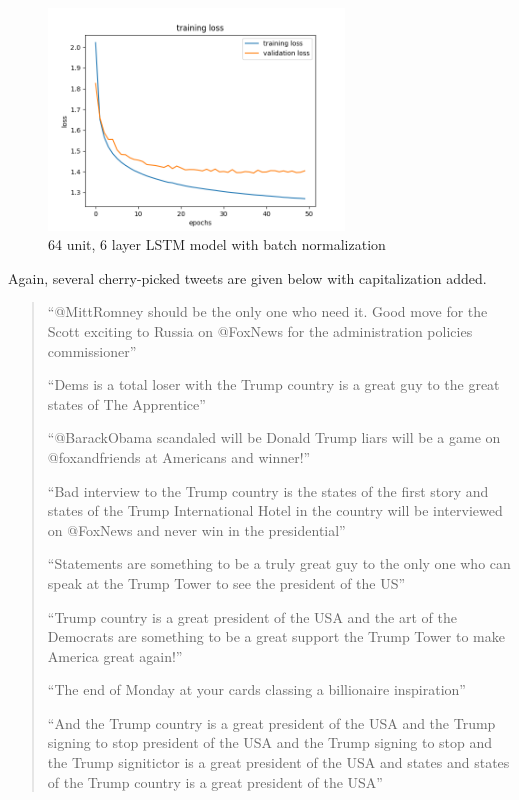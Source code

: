 \documentclass[letterpaper]{article}
\begin{document}
        \begin{figure}[h]
            \centering
            \includegraphics[width=0.7\textwidth]{figures/64x6-rms-batchnorm-50.png}
            \caption{64 unit, 6 layer LSTM model with batch normalization}\label{fig:64x6-loss}
        \end{figure}

        Again, several cherry-picked tweets are given below with capitalization added.

        \begin{quote}
            ``@MittRomney should be the only one who need it. Good move for the Scott exciting to Russia on @FoxNews for the administration policies commissioner''

            ``Dems is a total loser with the Trump country is a great guy to the great states of The Apprentice''

            ``@BarackObama scandaled will be Donald Trump liars will be a game on @foxandfriends at Americans and winner!''

            ``Bad interview to the Trump country is the states of the first story and states of the Trump International Hotel in the country will be interviewed on @FoxNews and never win in the presidential''

            ``Statements are something to be a truly great guy to the only one who can speak at the Trump Tower to see the president of the US''

            ``Trump country is a great president of the USA and the art of the Democrats are something to be a great support the Trump Tower to make America great again!''

            ``The end of Monday at your cards classing a billionaire inspiration''

            ``And the Trump country is a great president of the USA and the Trump signing to stop president of the USA and the Trump signing to stop and the Trump signitictor is a great president of the USA and states and states of the Trump country is a great president of the USA''
        \end{quote}
\end{document}
